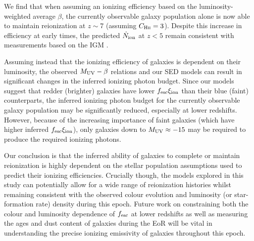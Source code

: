 We find that when assuming an ionizing efficiency based on the luminosity-weighted average $\beta$, the currently observable galaxy population alone is now able to maintain reionization at $z\sim7$ (assuming $C_{\textsc{Hii}} = 3$). Despite this increase in efficiency at early times, the predicted $\dot{N}_{\rm{ion}}$ at $z < 5$ remain consistent with measurements based on the IGM \citep{Becker:2013hc}.

Assuming instead that the ionizing efficiency of galaxies is dependent on their luminosity, the observed $M_{\rm{UV}} - \beta$ relations and our SED models can result in significant changes in the inferred ionizing photon budget. Since our models suggest that redder (brighter) galaxies have lower $f_{\rm{esc}}\xi_{\rm{ion}}$ than their blue (faint) counterparts, the inferred ionizing photon budget for the currently observable galaxy population may be significantly reduced, especially at lower redshifts. However, because of the increasing importance of faint galaxies (which have higher inferred $f_{\rm{esc}}\xi_{\rm{ion}}$), only galaxies down to $M_{\rm{UV}} \approx -15$ may be required to produce the required ionizing photons.

Our conclusion is that the inferred ability of galaxies to complete or maintain reionization is highly dependent on the stellar population assumptions used to predict their ionizing efficiencies. Crucially though, the models explored in this study can potentially allow for a wide range of reionization histories whilst remaining consistent with the observed colour evolution and luminosity (or star-formation rate) density during this epoch. Future work on constraining both the colour and luminosity dependence of $f_{\rm{esc}}$ at lower redshifts as well as measuring the ages and dust content of galaxies during the EoR will be vital in understanding the precise ionizing emissivity of galaxies throughout this epoch.


